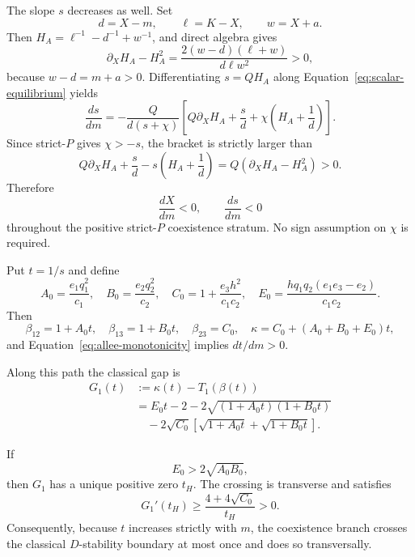 The slope \(s\) decreases as well. Set
\[
 d=X-m,\qquad
 \ell=K-X,\qquad
 w=X+a.
\]
Then \(H_A=\ell^{-1}-d^{-1}+w^{-1}\), and direct algebra gives
\begin{equation}
 \partial_XH_A-H_A^2
 =
 \frac{2(w-d)(\ell+w)}{d\ell w^2}>0,
 \label{eq:H-identity}
\end{equation}
because \(w-d=m+a>0\). Differentiating \(s=QH_A\) along Equation~\eqref{eq:scalar-equilibrium} yields
\begin{equation}
 \frac{ds}{dm}
 =
 -\frac{Q}{d(s+\chi)}
 \left[
 Q\partial_XH_A+\frac{s}{d}
 +\chi\left(H_A+\frac1d\right)
 \right].
 \label{eq:dsdm}
\end{equation}
Since strict-\(P\) gives \(\chi>-s\), the bracket is strictly larger than
\[
 Q\partial_XH_A+\frac{s}{d}
 -s\left(H_A+\frac1d\right)
 =
 Q(\partial_XH_A-H_A^2)>0.
\]
Therefore
\begin{equation}
 \boxed{
 \frac{dX}{dm}<0,\qquad
 \frac{ds}{dm}<0
 }
 \label{eq:allee-monotonicity}
\end{equation}
throughout the positive strict-\(P\) coexistence stratum. No sign assumption on \(\chi\) is required.

Put \(t=1/s\) and define
\[
 A_0=\frac{e_1q_1^2}{c_1},\quad
 B_0=\frac{e_2q_2^2}{c_2},\quad
 C_0=1+\frac{e_3h^2}{c_1c_2},\quad
 E_0=\frac{hq_1q_2(e_1e_3-e_2)}{c_1c_2}.
\]
Then
\begin{equation}
 \beta_{12}=1+A_0t,\quad
 \beta_{13}=1+B_0t,\quad
 \beta_{23}=C_0,\quad
 \kappa=C_0+(A_0+B_0+E_0)t,
 \label{eq:t-path}
\end{equation}
and Equation~\eqref{eq:allee-monotonicity} implies \(dt/dm>0\).

Along this path the classical gap is
\begin{align}
 G_1(t)
 &:=
 \kappa(t)-T_1(\beta(t))
 \nonumber\\
 &=
 E_0t-2
 -2\sqrt{(1+A_0t)(1+B_0t)}
 \nonumber\\
 &\quad
 -2\sqrt{C_0}
 \left[
 \sqrt{1+A_0t}
 +
 \sqrt{1+B_0t}
 \right].
 \label{eq:G1}
\end{align}

\begin{Theorem}\label{thm:crossing}
If
\begin{equation}
 E_0>2\sqrt{A_0B_0},
 \label{eq:cross-condition}
\end{equation}
then \(G_1\) has a unique positive zero \(t_H\). The crossing is transverse and satisfies
\begin{equation}
 G_1'(t_H)
 \ge
 \frac{4+4\sqrt{C_0}}{t_H}
 >0.
 \label{eq:transversality}
\end{equation}
Consequently, because \(t\) increases strictly with \(m\), the coexistence branch crosses the classical \(D\)-stability boundary at most once and does so transversally.
\end{Theorem}

